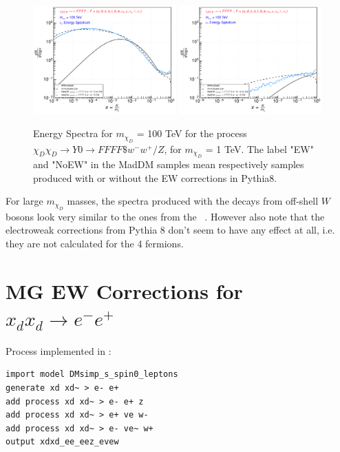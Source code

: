 \documentclass[epj,nopacs,fleqn]{svjour}
\begin{document}
\begin{figure}[!b]
\subfigure
{ \includegraphics[width=0.49\textwidth]{Fig/xdxd_FFFF_WZ/100_neutrinos_mu_FFFF_100.pdf}}
\subfigure
{ \includegraphics[width=0.49\textwidth]{Fig/xdxd_FFFF_WZ/100_neutrinos_tau_FFFF_100.pdf}}
\caption{Energy Spectra for $m_{\chi_D}$ = 100 TeV for the process $\chi_D \chi_D \rightarrow Y0 \rightarrow FFFF \$w^- w^+ /Z $, for $m_{\chi_D}$ = 1 TeV. The label "EW" and "NoEW" in the MadDM samples mean respectively samples produced with or without the EW corrections in Pythia8.}
\label{woff_100}
\end{figure}

For large $m_{\chi_D}$ masses, the spectra produced with the decays from off-shell $W$ bosons look very similar to the ones from the \PPPCew~. However also note that the electroweak corrections from Pythia 8 don't seem to have any effect at all, i.e. they are not calculated for the 4 fermions. 



\clearpage
\section{MG EW Corrections for $x_d x_d \rightarrow e^- e^+ $}
Process implemented in \MG:
\begin{verbatim}
import model DMsimp_s_spin0_leptons
generate xd xd~ > e- e+
add process xd xd~ > e- e+ z
add process xd xd~ > e+ ve w-
add process xd xd~ > e- ve~ w+
output xdxd_ee_eez_evew
\end{verbatim}
\end{document}
